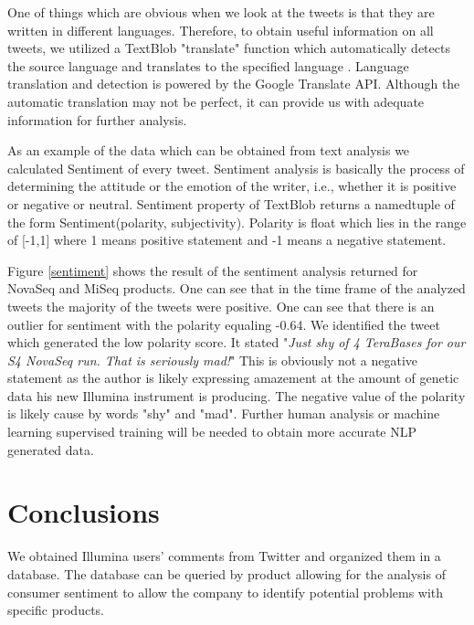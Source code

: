 \documentclass[10pt]{IEEEtran}
\begin{document}
One of things which are obvious when we look at the tweets is that they are written in different languages. Therefore, to obtain useful information on all tweets, we utilized a TextBlob "translate" function which automatically detects the source language and translates to the specified language \cite{textblob}. Language translation and detection is powered by the Google Translate API. Although the automatic translation may not be perfect, it can provide us with adequate information for further analysis.

As an example of the data which can be obtained from text analysis we calculated Sentiment of every tweet. Sentiment analysis is basically the process of determining the attitude or the emotion of the writer, i.e., whether it is positive or negative or neutral. Sentiment property of TextBlob returns a namedtuple of the form Sentiment(polarity, subjectivity). Polarity is float which lies in the range of [-1,1] where 1 means positive statement and -1 means a negative statement. 

Figure \ref{sentiment} shows the result of the sentiment analysis returned for NovaSeq and MiSeq products. One can see that in the time frame of the analyzed tweets the majority of the tweets were positive. One can see that there is an outlier for sentiment with the polarity equaling -0.64. We identified the tweet which generated the low polarity score. It stated "\textit{Just shy of 4 TeraBases for our S4 NovaSeq run. That is seriously mad!}" This is obviously not a negative statement as the author is likely expressing amazement at the amount of genetic data his new Illumina instrument is producing. The negative value of the polarity is likely cause by words "shy" and "mad". Further human analysis or machine learning supervised training will be needed to obtain more accurate NLP generated data.  


\section{Conclusions}
We obtained Illumina users' comments from Twitter and organized them in a database. The database can be queried by product allowing for the analysis of consumer sentiment to allow the company to identify potential problems with specific products.






\end{document}
